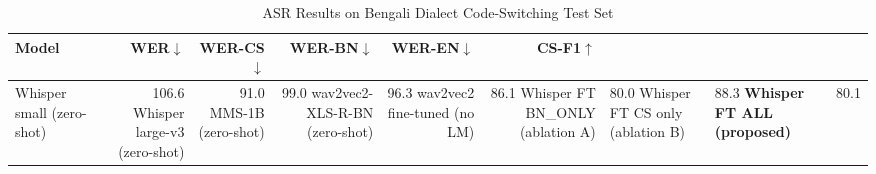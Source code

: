 \begin{table}[ht]
\centering
\caption{ASR Results on Bengali Dialect Code-Switching Test Set}
\label{tab:asr_results}
\begin{tabular}{lrrrrr}
\toprule
Model & WER$\downarrow$ & WER-CS$\downarrow$ & WER-BN$\downarrow$ & WER-EN$\downarrow$ & CS-F1$\uparrow$ \\
\midrule
Whisper small (zero-shot) & 106.6%
Whisper large-v3 (zero-shot) & 91.0%
MMS-1B (zero-shot) & 99.0%
\midrule
wav2vec2-XLS-R-BN (zero-shot) & 96.3%
wav2vec2 fine-tuned (no LM) & 86.1%
Whisper FT BN\_ONLY (ablation A) & 80.0%
Whisper FT CS only (ablation B) & 88.3%
\textbf{Whisper FT ALL (proposed)} & 80.1%
\bottomrule
\end{tabular}
\end{table}